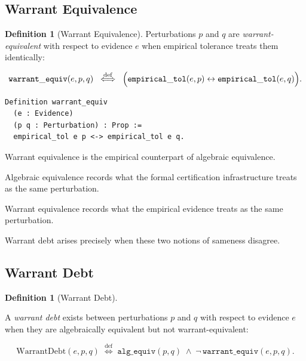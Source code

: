 \documentclass[pdflatex,sn-mathphys-num]{sn-jnl}
\theoremstyle{plain}
\theoremstyle{definition}
\newtheorem{definition}[theorem]{Definition}
\theoremstyle{remark}
\newcommand{\WD}{\mathrm{WarrantDebt}}
\begin{document}
\subsection{Warrant Equivalence}

\begin{definition}[Warrant Equivalence]

Perturbations $p$ and $q$ are \emph{warrant-equivalent} with respect
to evidence $e$ when empirical tolerance treats them identically:

\[
\mathtt{warrant\_equiv}(e,p,q)
\;\stackrel{\mathrm{def}}{\iff}\;
\Bigl(
\mathtt{empirical\_tol}(e,p)
\leftrightarrow
\mathtt{empirical\_tol}(e,q)
\Bigr).
\]

\end{definition}

\begin{lstlisting}[style=rocq,
caption={Warrant equivalence.}]
Definition warrant_equiv
  (e : Evidence)
  (p q : Perturbation) : Prop :=
  empirical_tol e p <-> empirical_tol e q.
\end{lstlisting}

Warrant equivalence is the empirical counterpart of algebraic
equivalence.

Algebraic equivalence records what the formal certification
infrastructure treats as the same perturbation.

Warrant equivalence records what the empirical evidence treats as the
same perturbation.

Warrant debt arises precisely when these two notions of sameness
disagree.

\subsection{Warrant Debt}

\begin{definition}[Warrant Debt]
\label{def:warrant-debt}

A \emph{warrant debt} exists between perturbations $p$ and $q$ with
respect to evidence $e$ when they are algebraically equivalent but not
warrant-equivalent:

\[
\WD(e,p,q)
\;\stackrel{\mathrm{def}}{\iff}\;
\mathtt{alg\_equiv}(p,q)
\;\wedge\;
\neg\,\mathtt{warrant\_equiv}(e,p,q).
\]

\end{definition}
\end{document}
